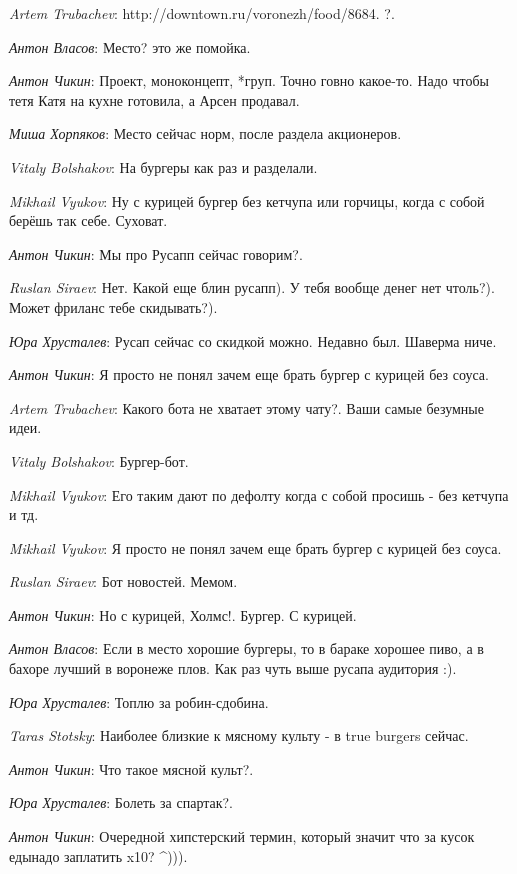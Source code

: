 \documentclass[10pt]{book}
\newcommand{\AUTHOR}[1]{\emph{#1}:}
\begin{document}
\AUTHOR{Artem Trubachev} http://downtown.ru/voronezh/food/8684. ?.

\AUTHOR{Антон Власов} Место? это же помойка.

\AUTHOR{Антон Чикин} Проект, моноконцепт, *груп. Точно говно какое-то. Надо чтобы тетя Катя на кухне готовила, а Арсен продавал.

\AUTHOR{Миша Хорпяков} Место сейчас норм, после раздела акционеров.

\AUTHOR{Vitaly Bolshakov} На бургеры как раз и разделали.

\AUTHOR{Mikhail Vyukov} Ну с курицей бургер без кетчупа или горчицы, когда с собой берёшь так себе. Суховат.

\AUTHOR{Антон Чикин} Мы про Русапп сейчас говорим?.

\AUTHOR{Ruslan Siraev} Нет. Какой еще блин русапп). У тебя вообще денег нет чтоль?). Может фриланс тебе скидывать?).

\AUTHOR{Юра Хрусталев} Русап сейчас со скидкой можно. Недавно был. Шаверма ниче.

\AUTHOR{Антон Чикин} Я просто не понял зачем еще брать бургер с курицей без соуса.

\AUTHOR{Artem Trubachev} Какого бота не хватает этому чату?. Ваши самые безумные идеи.

\AUTHOR{Vitaly Bolshakov} Бургер-бот.

\AUTHOR{Mikhail Vyukov} Его таким дают по дефолту когда с собой просишь - без кетчупа и тд.

\AUTHOR{Mikhail Vyukov} Я просто не понял зачем еще брать бургер с курицей без соуса.

\AUTHOR{Ruslan Siraev} Бот новостей. Мемом.

\AUTHOR{Антон Чикин} Но с курицей, Холмс!. Бургер. С курицей.

\AUTHOR{Антон Власов} Если в место хорошие бургеры, то в бараке хорошее пиво, а в бахоре лучший в воронеже плов. Как раз чуть выше русапа аудитория :).

\AUTHOR{Юра Хрусталев} Топлю за робин-сдобина.

\AUTHOR{Taras Stotsky} Наиболее близкие к мясному культу - в true burgers сейчас.

\AUTHOR{Антон Чикин} Что такое мясной культ?.

\AUTHOR{Юра Хрусталев} Болеть за спартак?.

\AUTHOR{Антон Чикин} Очередной хипстерский термин, который значит что за кусок еды\whatever надо заплатить x10? ^))).
\end{document}
